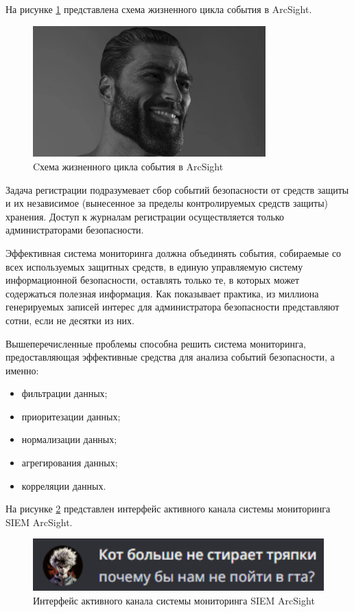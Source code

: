 На рисунке \ref{life_cycle} представлена схема жизненного цикла события в ArcSight.
\begin{figure}[H]
  \centering
  \includegraphics[width=0.8\textwidth]{image/10.jpg}
  \caption{Cхема жизненного цикла события в ArcSight}
  \label{life_cycle}
\end{figure}

Задача регистрации подразумевает сбор событий безопасности от средств защиты и их независимое (вынесенное за пределы контролируемых средств защиты) хранения. Доступ к журналам регистрации осуществляется только администраторами безопасности.

Эффективная система мониторинга должна объединять события, собираемые со всех используемых защитных средств, в единую управляемую систему информационной безопасности, оставлять только те, в которых может содержаться полезная информация. Как показывает практика, из миллиона генерируемых записей интерес для администратора безопасности представляют сотни, если не десятки из них.

Вышеперечисленные проблемы способна решить система мониторинга, предоставляющая эффективные средства для анализа событий безопасности, а именно:
\begin{itemize}
    \item фильтрации данных;
    \item приоритезации данных;
    \item нормализации данных;
    \item агрегирования данных;
    \item корреляции данных.
\end{itemize}


На рисунке \ref{ArcSightMon} представлен интерфейс активного канала системы мониторинга SIEM ArcSight.

\begin{figure}[H]
  \centering
  \includegraphics[width=1\textwidth]{image/11.png}
  \caption{Интерфейс активного канала системы мониторинга SIEM ArcSight}
  \label{ArcSightMon}
\end{figure}

